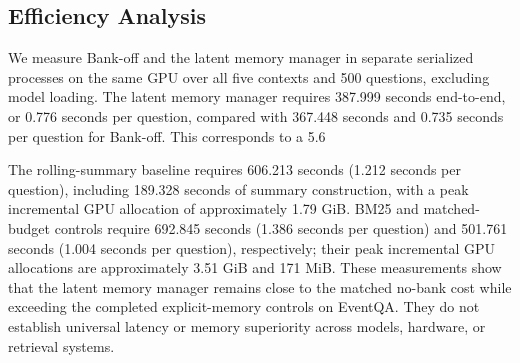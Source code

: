 

\subsection{Efficiency Analysis}

We measure Bank-off and the latent memory manager in separate serialized processes on the same GPU over all five contexts and 500 questions, excluding model loading. The latent memory manager requires 387.999 seconds end-to-end, or 0.776 seconds per question, compared with 367.448 seconds and 0.735 seconds per question for Bank-off. This corresponds to a 5.6%

The rolling-summary baseline requires 606.213 seconds (1.212 seconds per question), including 189.328 seconds of summary construction, with a peak incremental GPU allocation of approximately 1.79 GiB. BM25 and matched-budget controls require 692.845 seconds (1.386 seconds per question) and 501.761 seconds (1.004 seconds per question), respectively; their peak incremental GPU allocations are approximately 3.51 GiB and 171 MiB. These measurements show that the latent memory manager remains close to the matched no-bank cost while exceeding the completed explicit-memory controls on EventQA. They do not establish universal latency or memory superiority across models, hardware, or retrieval systems.


